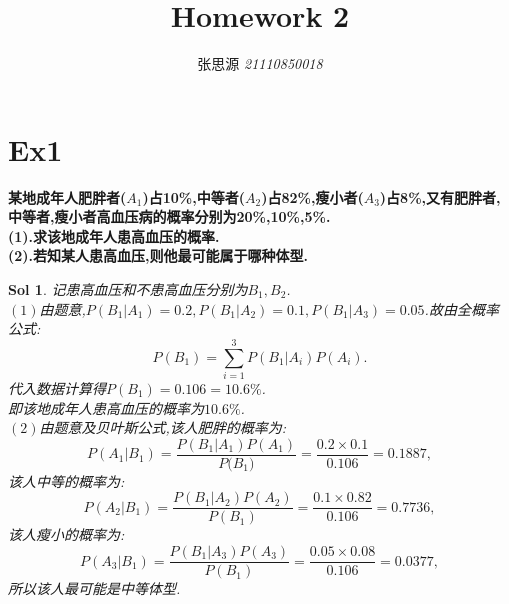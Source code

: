 \documentclass[UTF8,a4paper,11pt]{ctexart}
\title{\textbf{Homework 2}}
\author{ 张思源  \qquad  \textit{21110850018} }   %
\newtheorem{sol}{Sol}[section]
\begin{document}
\maketitle
\section{Ex1}
\textbf{某地成年人肥胖者($A_{1}$)占10\%,中等者($A_{2}$)占82\%,瘦小者($A_{3}$)占8\%,又有肥胖者,中等者,瘦小者高血压病的概率分别为20\%,10\%,5\%.\\
(1).求该地成年人患高血压的概率.\\
(2).若知某人患高血压,则他最可能属于哪种体型.}
\begin{sol}
	记患高血压和不患高血压分别为$B_{1},B_{2}$.\\
	$(1)$由题意,$P(B_{1}|A_{1})=0.2,P(B_{1}|A_{2})=0.1,P(B_{1}|A_{3})=0.05$.故由全概率公式:
	$$
	P(B_{1})=\sum_{i=1}^{3}P(B_{1}|A_{i})P(A_{i}).
	$$
	代入数据计算得$P(B_{1})=0.106=10.6\%$.\\
	即该地成年人患高血压的概率为$10.6\%$.\\
	$(2)$由题意及贝叶斯公式,该人肥胖的概率为:
	$$
	P(A_{1}|B_{1})=\frac{P(B_{1}|A_{1})P(A_{1})}{P({B_{1})}}=
	\frac{0.2\times0.1}{0.106}=0.1887,
	$$
	该人中等的概率为:
		$$
	P(A_{2}|B_{1})=\frac{P(B_{1}|A_{2})P(A_{2})}{P{(B_{1})}}=
	\frac{0.1\times0.82}{0.106}=0.7736,
	$$
	该人瘦小的概率为:
		$$
	P(A_{3}|B_{1})=\frac{P(B_{1}|A_{3})P(A_{3})}{P({B_{1}})}=
	\frac{0.05\times0.08}{0.106}=0.0377,
	$$
	所以该人最可能是中等体型.
\end{sol}
\end{document}
